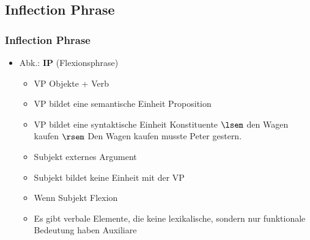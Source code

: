 \subsection{Inflection Phrase}

\begin{frame}
\frametitle{Inflection Phrase}

\begin{itemize}
	\item Abk.: \textbf{IP} (Flexionsphrase)
	\begin{itemize}
		\item VP \ras Objekte + Verb
		\item VP bildet eine semantische Einheit \ras Proposition
		\item VP bildet eine syntaktische Einheit \ras Konstituente
		\eal
		\ex $\lsem$ den Wagen kaufen $\rsem$
		\ex \alert{Den Wagen kaufen} musste Peter gestern. 
		\zl

\pause
		\item Subjekt \ras externes Argument
		\item Subjekt bildet keine Einheit mit der VP	
		\z

		\item Wenn Subjekt \ras Flexion		
		\z
		
		\item Es gibt verbale Elemente, die keine lexikalische, sondern nur funktionale Bedeutung haben \ras Auxiliare

	\end{itemize}
\end{itemize}

\end{frame}


